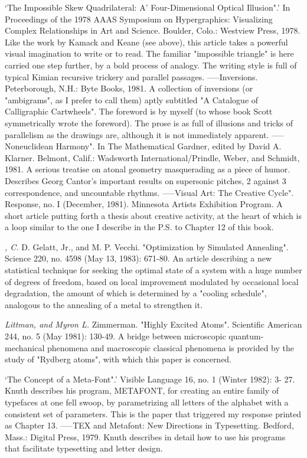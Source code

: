  `The Impossible Skew Quadrilateral: A' Four-Dimensional Optical Illusion".' In Proceedings of the 1978 AAAS Symposium on Hypergraphics: Visualizing Complex Relationships in Art and Science. Boulder, Colo.: Westview Press, 1978. Like the work by Kamack and Keane (see above), this article takes a powerful visual imagination to write or to read. The familiar "impossible triangle" is here carried one step further, by a bold process of analogy. The writing style is full of typical Kimian recursive trickery and parallel passages. -----Inversions. Peterborough, N.H.: Byte Books, 1981. A collection of inversions (or "ambigrams", as I prefer to call them) aptly subtitled "A Catalogue of Calligraphic Cartwheels". The foreword is by myself (to whose book Scott symmetrically wrote the foreword). The prose is as full of illusions and tricks of parallelism as the drawings are, although it is not immediately apparent. -----Noneuclidean Harmony". In The Mathematical Gardner, edited by David A. Klarner. Belmont, Calif.: Wadsworth International/Prindle, Weber, and Schmidt, 1981. A serious treatise on atonal geometry masquerading as a piece of humor. Describes Georg Cantor's important results on supersonic pitches, 2 against 3 correspondence, and uncountable rhythms. -----Visual Art: The Creative Cycle". Response, no. I (December, 1981). Minnesota Artists Exhibition Program. A short article putting forth a thesis about creative activity, at the heart of which is a loop similar to the one I describe in the P.S. to Chapter 12 of this book.

 {\sl , C.} D. Gelatt, Jr., and M. P. Vecchi. "Optimization by Simulated Annealing". Science 220, no. 4598 (May 13, 1983): 671-80. An article describing a new statistical technique for seeking the optimal state of a system with a huge number of degrees of freedom, based on local improvement modulated by occasional local degradation, the amount of which is determined by a "cooling schedule", analogous to the annealing of a metal to strengthen it.

 {\sl Littman, and Myron L.} Zimmerman. "Highly Excited Atoms". Scientific American 244, no. 5 (May 1981): 130-49. A bridge between microscopic quantum-mechanical phenomena and macroscopic classical phenomena is provided by the study of "Rydberg atoms", with which this paper is concerned.

 `The Concept of a Meta-Font".' Visible Language 16, no. 1 (Winter 1982): 3- 27. Knuth describes his program, METAFONT, for creating an entire family of typefaces at one fell swoop, by parametrizing all letters of the alphabet with a consistent set of parameters. This is the paper that triggered my response printed as Chapter 13. -----TEX and Metafont: New Directions in Typesetting. Bedford, Mass.: Digital Press, 1979. Knuth describes in detail how to use his programs that facilitate typesetting and letter design.

